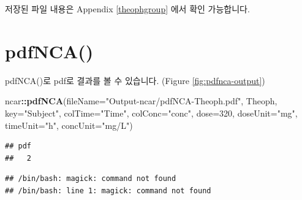 \documentclass[12pt,]{krantz}
\newenvironment{Shaded}{\begin{snugshade}}{\end{snugshade}}
\newcommand{\DataTypeTok}[1]{\textcolor[rgb]{0.13,0.29,0.53}{#1}}
\newcommand{\DecValTok}[1]{\textcolor[rgb]{0.00,0.00,0.81}{#1}}
\newcommand{\ExtensionTok}[1]{#1}
\newcommand{\KeywordTok}[1]{\textcolor[rgb]{0.13,0.29,0.53}{\textbf{#1}}}
\newcommand{\NormalTok}[1]{#1}
\newcommand{\OperatorTok}[1]{\textcolor[rgb]{0.81,0.36,0.00}{\textbf{#1}}}
\newcommand{\StringTok}[1]{\textcolor[rgb]{0.31,0.60,0.02}{#1}}
\begin{document}
\begin{Shaded}
\end{Shaded}

저장된 파일 내용은 Appendix \ref{theophgroup} 에서 확인 가능합니다.

\hypertarget{pdfnca}{%
\section{pdfNCA()}\label{pdfnca}}

pdfNCA()로 pdf로 결과를 볼 수 있습니다. (Figure \ref{fig:pdfnca-output})

\begin{Shaded}
\begin{Highlighting}[]
\NormalTok{ncar}\OperatorTok{::}\KeywordTok{pdfNCA}\NormalTok{(}\DataTypeTok{fileName=}\StringTok{"Output-ncar/pdfNCA-Theoph.pdf"}\NormalTok{, Theoph, }\DataTypeTok{key=}\StringTok{"Subject"}\NormalTok{, }
             \DataTypeTok{colTime=}\StringTok{"Time"}\NormalTok{,  }\DataTypeTok{colConc=}\StringTok{"conc"}\NormalTok{, }\DataTypeTok{dose=}\DecValTok{320}\NormalTok{, }\DataTypeTok{doseUnit=}\StringTok{"mg"}\NormalTok{, }
             \DataTypeTok{timeUnit=}\StringTok{"h"}\NormalTok{, }\DataTypeTok{concUnit=}\StringTok{"mg/L"}\NormalTok{)}
\end{Highlighting}
\end{Shaded}

\begin{verbatim}
## pdf 
##   2
\end{verbatim}

\begin{Shaded}
\end{Shaded}

\begin{verbatim}
## /bin/bash: magick: command not found
## /bin/bash: line 1: magick: command not found
\end{verbatim}
\end{document}
